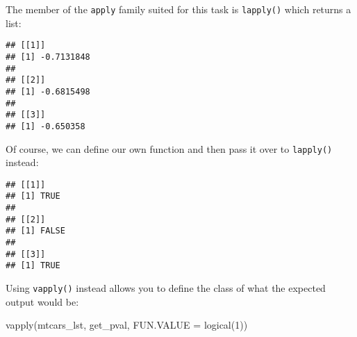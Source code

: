 \documentclass[
]{book}
\newenvironment{Shaded}{\begin{snugshade}}{\end{snugshade}}
\newcommand{\AttributeTok}[1]{\textcolor[rgb]{0.77,0.63,0.00}{#1}}
\newcommand{\ConstantTok}[1]{\textcolor[rgb]{0.00,0.00,0.00}{#1}}
\newcommand{\ControlFlowTok}[1]{\textcolor[rgb]{0.13,0.29,0.53}{\textbf{#1}}}
\newcommand{\DecValTok}[1]{\textcolor[rgb]{0.00,0.00,0.81}{#1}}
\newcommand{\FloatTok}[1]{\textcolor[rgb]{0.00,0.00,0.81}{#1}}
\newcommand{\FunctionTok}[1]{\textcolor[rgb]{0.00,0.00,0.00}{#1}}
\newcommand{\NormalTok}[1]{#1}
\newcommand{\OtherTok}[1]{\textcolor[rgb]{0.56,0.35,0.01}{#1}}
\newcommand{\SpecialCharTok}[1]{\textcolor[rgb]{0.00,0.00,0.00}{#1}}
\begin{document}
The member of the \texttt{apply} family suited for this task is \texttt{lapply()} which returns a list:

\begin{Shaded}
\end{Shaded}

\begin{verbatim}
## [[1]]
## [1] -0.7131848
## 
## [[2]]
## [1] -0.6815498
## 
## [[3]]
## [1] -0.650358
\end{verbatim}

Of course, we can define our own function and then pass it over to \texttt{lapply()} instead:

\begin{Shaded}
\end{Shaded}

\begin{verbatim}
## [[1]]
## [1] TRUE
## 
## [[2]]
## [1] FALSE
## 
## [[3]]
## [1] TRUE
\end{verbatim}

Using \texttt{vapply()} instead allows you to define the class of what the expected output would be:

\begin{Shaded}
\begin{Highlighting}[]
\FunctionTok{vapply}\NormalTok{(mtcars\_lst, get\_pval, }\AttributeTok{FUN.VALUE =} \FunctionTok{logical}\NormalTok{(}\DecValTok{1}\NormalTok{))}
\end{Highlighting}
\end{Shaded}
\end{document}
